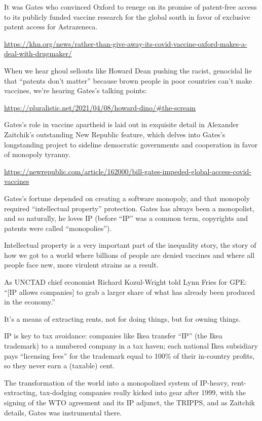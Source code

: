 \documentclass[
]{book}
\begin{document}
It was Gates who convinced Oxford to renege on its promise of patent-free access to its publicly funded vaccine research for the global south in favor of exclusive patent access for Astrazeneca.

\url{https://khn.org/news/rather-than-give-away-its-covid-vaccine-oxford-makes-a-deal-with-drugmaker/}

When we hear ghoul sellouts like Howard Dean pushing the racist, genocidal lie that ``patents don't matter'' because brown people in poor countries can't make vaccines, we're hearing Gates's talking points:

\url{https://pluralistic.net/2021/04/08/howard-dino/\#the-scream}

Gates's role in vaccine apartheid is laid out in exquisite detail in Alexander Zaitchik's outstanding New Republic feature, which delves into Gates's longstanding project to sideline democratic governments and cooperation in favor of monopoly tyranny.

\url{https://newrepublic.com/article/162000/bill-gates-impeded-global-access-covid-vaccines}

Gates's fortune depended on creating a software monopoly, and that monopoly required ``intellectual property'' protection. Gates has always been a monopolist, and so naturally, he loves IP (before ``IP'' was a common term, copyrights and patents were called ``monopolies'').

Intellectual property is a very important part of the inequality story, the story of how we got to a world where billions of people are denied vaccines and where all people face new, more virulent strains as a result.

As UNCTAD chief economist Richard Kozul-Wright told Lynn Fries for GPE: ``{[}IP allows companies{]} to grab a larger share of what has already been produced in the economy.''

It's a means of extracting rents, not for doing things, but for owning things.

IP is key to tax avoidance: companies like Ikea transfer ``IP'' (the Ikea trademark) to a numbered company in a tax haven; each national Ikea subsidiary pays ``licensing fees'' for the trademark equal to 100\% of their in-country profits, so they never earn a (taxable) cent.

The transformation of the world into a monopolized system of IP-heavy, rent-extracting, tax-dodging companies really kicked into gear after 1999, with the signing of the WTO agreement and its IP adjunct, the TRIPPS, and as Zaitchik details, Gates was instrumental there.
\end{document}
